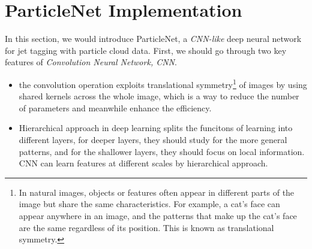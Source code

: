 \documentclass[12pt]{article}
\numberwithin{equation}{section}
\begin{document}
\section{ParticleNet Implementation}

In this section, we would introduce ParticleNet, a \textit{CNN-like} deep neural network for jet tagging with particle cloud data. First, we should go through two key features of \textit{Convolution Neural Network, CNN}. 

\begin{itemize}
    \item the convolution operation exploits translational symmetry\footnote{ In natural images, objects or features often appear in different parts of the image but share the same characteristics. For example, a cat's face can appear anywhere in an image, and the patterns that make up the cat's face are the same regardless of its position. This is known as translational symmetry.} of images by using shared kernels across the whole image, which is a way to reduce the number of parameters and meanwhile enhance the efficiency.
    \item Hierarchical approach in deep learning splits the funcitons of learning into different layers, for deeper layers, they should study for the more general patterns, and for the shallower layers, they should focus on local information. CNN can learn features at different scales by hierarchical approach.
\end{itemize}
\end{document}
